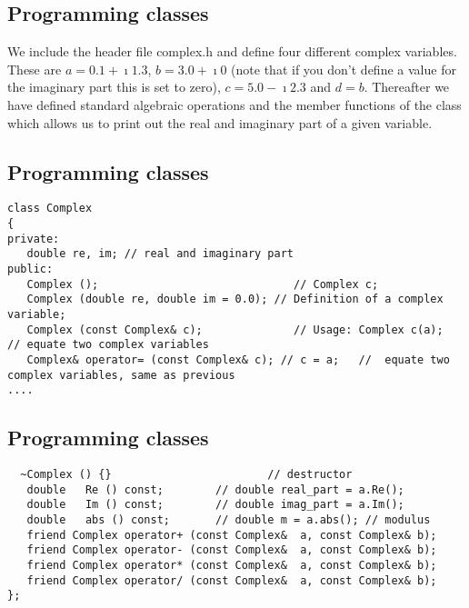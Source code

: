 \documentclass[%
oneside,                 %
final,                   %
10pt]{article}
\begin{document}
\subsection*{Programming classes}

We include the header file complex.h and define four different complex variables. These
are $a=0.1+\imath 1.3$, $b=3.0+\imath 0$ (note that if you don't define a value for the imaginary part  this is set to
zero), $c=5.0-\imath 2.3$ and $d=b$.  Thereafter we have defined standard algebraic operations and the member functions
of the class which allows us to print out the real and imaginary part of a given variable.

\subsection*{Programming classes}

\begin{verbatim}
class Complex
{
private:
   double re, im; // real and imaginary part
public:
   Complex ();                              // Complex c;
   Complex (double re, double im = 0.0); // Definition of a complex variable;
   Complex (const Complex& c);              // Usage: Complex c(a);   // equate two complex variables
   Complex& operator= (const Complex& c); // c = a;   //  equate two complex variables, same as previous
....

\end{verbatim}

\subsection*{Programming classes}

\begin{verbatim}
  ~Complex () {}                        // destructor
   double   Re () const;        // double real_part = a.Re();
   double   Im () const;        // double imag_part = a.Im();
   double   abs () const;       // double m = a.abs(); // modulus
   friend Complex operator+ (const Complex&  a, const Complex& b);
   friend Complex operator- (const Complex&  a, const Complex& b);
   friend Complex operator* (const Complex&  a, const Complex& b);
   friend Complex operator/ (const Complex&  a, const Complex& b);
};
\end{verbatim}
\end{document}
